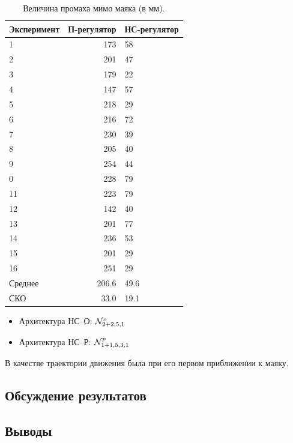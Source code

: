 \begin{table}
\caption{Величина промаха мимо маяка (в мм).}
\begin{tabular}{|l|r|l|}
\hline
Эксперимент & П-регулятор & НС-регулятор \\
\hline
1&	173&	58\\
2&	201&	47\\
3&	179&	22\\
4&	147&	57\\
5&	218&	29\\
6&	216&	72\\
7&	230&	39\\
8&	205&	40\\
9&	254&	44\\
0&	228&	79\\
11&	223&	79\\
12&	142&	40\\
13&	201&	77\\
14&	236&	53\\
15&	201&	29\\
16&	251&	29\\
\hline
Среднее&206.6&	49.6\\
СКО&	33.0&	19.1\\
\hline
\end{tabular}
\end{table}

\begin{itemize}

\item Архитектура НС--О: $\mathcal{N}^o_{2+2,5,1}$

\item Архитектура НС--Р: $\mathcal{N}^p_{1+1,5,3,1}$

\end{itemize}


В качестве траектории движения была   при его первом приближении к маяку.


\subsection{Обсуждение результатов}
\subsection{Выводы}

